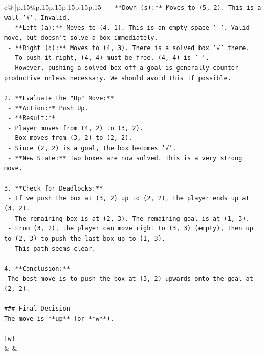 \documentclass{article}
\begin{document}
{\begin{supertabular}{c@{$\;$}|p{.15\linewidth}@{}p{.15\linewidth}p{.15\linewidth}p{.15\linewidth}p{.15\linewidth}p{.15\linewidth}}
{{{\texttt{    {-} **Down (s):** Moves to (5, 2). This is a wall '\#'. Invalid.} \\
\texttt{    {-} **Left (a):** Moves to (4, 1). This is an empty space '\_'. Valid move, but doesn't solve a box immediately.} \\
\texttt{    {-} **Right (d):** Moves to (4, 3). There is a solved box '√' there.} \\
\texttt{        {-} To push it right, (4, 4) must be free. (4, 4) is '\_'.} \\
\texttt{        {-} However, pushing a solved box off a goal is generally counter{-}productive unless necessary. We should avoid this if possible.} \\
\\ 
\texttt{2.  **Evaluate the "Up" Move:**} \\
\texttt{    {-} **Action:** Push Up.} \\
\texttt{    {-} **Result:**} \\
\texttt{        {-} Player moves from (4, 2) to (3, 2).} \\
\texttt{        {-} Box moves from (3, 2) to (2, 2).} \\
\texttt{        {-} Since (2, 2) is a goal, the box becomes '√'.} \\
\texttt{    {-} **New State:** Two boxes are now solved. This is a very strong move.} \\
\\ 
\texttt{3.  **Check for Deadlocks:**} \\
\texttt{    {-} If we push the box at (3, 2) up to (2, 2), the player ends up at (3, 2).} \\
\texttt{    {-} The remaining box is at (2, 3). The remaining goal is at (1, 3).} \\
\texttt{    {-} From (3, 2), the player can move right to (3, 3) (empty), then up to (2, 3) to push the last box up to (1, 3).} \\
\texttt{    {-} This path seems clear.} \\
\\ 
\texttt{4.  **Conclusion:**} \\
\texttt{    The best move is to push the box at (3, 2) upwards onto the goal at (2, 2).} \\
\\ 
\texttt{\#\#\# Final Decision} \\
\texttt{The move is **up** (or **w**).} \\
\\ 
\texttt{{[}w{]}} \\
            }
        }
    }
    & & \\ \\


\end{supertabular}}
\end{document}
